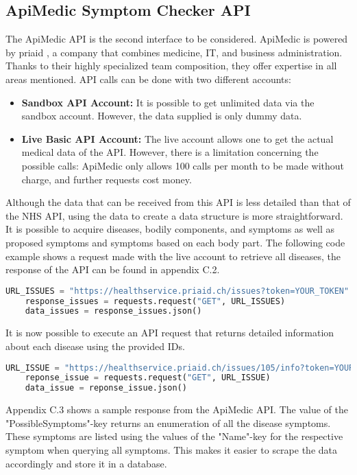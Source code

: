 \subsection{ApiMedic Symptom Checker API}
The ApiMedic API is the second interface to be considered. ApiMedic is powered by priaid \cite{.apimedic}, a company that combines medicine, IT, and business administration. Thanks to their highly specialized team composition, they offer expertise in all areas mentioned. API calls can be done with two different accounts:
\begin{itemize}
	\item \textbf{Sandbox API Account:}
	It is possible to get unlimited data via the sandbox account. However, the data supplied is only dummy data.
	\item \textbf{Live Basic API Account:}
	The live account allows one to get the actual medical data of the API. However, there is a limitation concerning the possible calls: ApiMedic only allows 100 calls per month to be made without charge, and further requests cost money.
\end{itemize}
Although the data that can be received from this API is less detailed than that of the NHS API, using the data to create a data structure is more straightforward. It is possible to acquire diseases, bodily components, and symptoms as well as proposed symptoms and symptoms based on each body part. The following code example shows a request made with the live account to retrieve all diseases, the response of the API can be found in appendix C.2.
\begin{lstlisting}[language=Python, caption={Example Python Request for the ApiMedic API (all issues)}]
	URL_ISSUES = "https://healthservice.priaid.ch/issues?token=YOUR_TOKEN"
	response_issues = requests.request("GET", URL_ISSUES)
	data_issues = response_issues.json()
\end{lstlisting}
\noindent
It is now possible to execute an API request that returns detailed information about each disease using the provided IDs. 
\begin{lstlisting}[language=Python, caption={Example Python Request for the ApiMedic API (single issue)}]
	URL_ISSUE = "https://healthservice.priaid.ch/issues/105/info?token=YOUR_TOKEN"
	reponse_issue = requests.request("GET", URL_ISSUE)
	data_issue = reponse_issue.json()
\end{lstlisting}
\noindent 
Appendix C.3 shows a sample response from the ApiMedic API. The value of the "PossibleSymptoms"-key returns an enumeration of all the disease symptoms. These symptoms are listed using the values of the "Name"-key for the respective symptom when querying all symptoms. This makes it easier to scrape the data accordingly and store it in a database.

